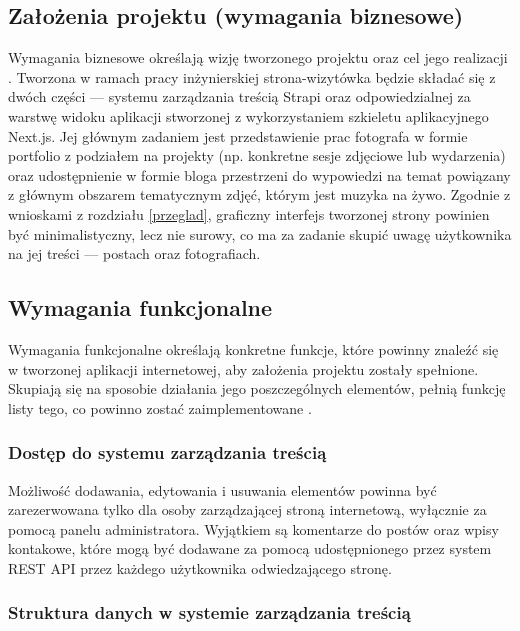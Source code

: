 \documentclass[12pt]{article}
\numberwithin{figure}{section}
\begin{document}
\begin{sloppypar}

\subsection{Założenia projektu (wymagania biznesowe)}

Wymagania biznesowe określają wizję tworzonego projektu oraz cel jego realizacji \cite{wymagania}. Tworzona w ramach pracy inżynierskiej strona-wizytówka będzie składać się z dwóch części --- systemu zarządzania treścią Strapi oraz odpowiedzialnej za warstwę widoku aplikacji stworzonej z wykorzystaniem szkieletu aplikacyjnego Next.js. Jej głównym zadaniem jest przedstawienie prac fotografa w formie portfolio z podziałem na projekty (np. konkretne sesje zdjęciowe lub wydarzenia) oraz udostępnienie w formie bloga przestrzeni do wypowiedzi na temat powiązany z głównym obszarem tematycznym zdjęć, którym jest muzyka na żywo. Zgodnie z wnioskami z rozdziału \ref{przeglad}, graficzny interfejs tworzonej strony powinien być minimalistyczny, lecz nie surowy, co ma za zadanie skupić uwagę użytkownika na jej treści --- postach oraz fotografiach. 


\subsection{Wymagania funkcjonalne}

Wymagania funkcjonalne określają konkretne funkcje, które powinny znaleźć się w tworzonej aplikacji internetowej, aby założenia projektu zostały spełnione. Skupiają się na sposobie działania jego poszczególnych elementów, pełnią funkcję listy tego, co powinno zostać zaimplementowane \cite{wymagania}. 

\subsubsection*{Dostęp do systemu zarządzania treścią}

Możliwość dodawania, edytowania i usuwania elementów powinna być zarezerwowana tylko dla osoby zarządzającej stroną internetową, wyłącznie za pomocą panelu administratora. Wyjątkiem są komentarze do postów oraz wpisy kontakowe, które mogą być dodawane za pomocą udostępnionego przez system REST API przez każdego użytkownika odwiedzającego stronę. 

\subsubsection*{Struktura danych w systemie zarządzania treścią}


\end{sloppypar}
\end{document}
